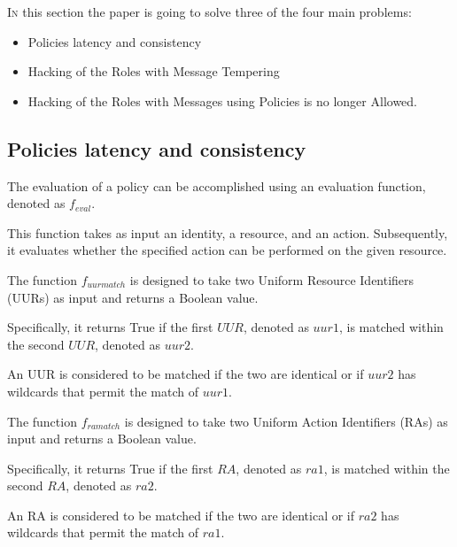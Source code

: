 \lettrine{I}{n} this section the paper is going to solve three of the four main problems:

\begin{itemize}
    \item Policies latency and consistency
    \item Hacking of the Roles with Message Tempering
    \item Hacking of the Roles with Messages using Policies is no longer Allowed.
\end{itemize}

\subsection{Policies latency and consistency}
\label{sec:policies-latency-consistency}

The evaluation of a policy can be accomplished using an evaluation function, denoted as $f_{eval}$.

This function takes as input an identity, a resource, and an action. 
Subsequently, it evaluates whether the specified action can be performed on the given resource.

\begin{boxF}
    \begin{definition}
        The function $f_{uurmatch}$ is designed to take two Uniform Resource Identifiers (UURs) as input and returns a Boolean value.
        
        Specifically, it returns True if the first $UUR$, denoted as $uur1$, is matched within the second $UUR$, denoted as $uur2$. 
        
        An UUR is considered to be matched if the two are identical or if $uur2$ has wildcards that permit the match of $uur1$.
    \end{definition}
\end{boxF}

\begin{boxF}
    \begin{definition}
        The function $f_{ramatch}$ is designed to take two Uniform Action Identifiers (RAs) as input and returns a Boolean value.
        
        Specifically, it returns True if the first $RA$, denoted as $ra1$, is matched within the second $RA$, denoted as $ra2$. 
        
        An RA is considered to be matched if the two are identical or if $ra2$ has wildcards that permit the match of $ra1$.
    \end{definition}
\end{boxF}

